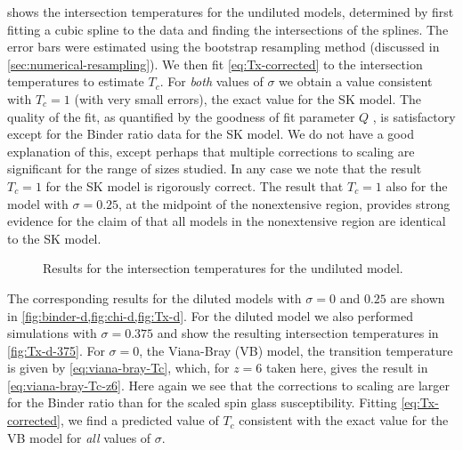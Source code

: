  shows the intersection temperatures for the undiluted models,
determined by first fitting a cubic spline to the data and finding the
intersections of the splines. The error bars were estimated using the bootstrap
resampling method (discussed in \cref{sec:numerical-resampling}). We then fit
\cref{eq:Tx-corrected} to the intersection temperatures to estimate $T_c$. For
\emph{both} values of $\sigma$ we obtain a value consistent with $T_c=1$ (with
very small errors), the exact value for the SK model. The quality of the fit,
as quantified by the goodness of fit parameter $Q$
\autocite{press2007numerical}, is satisfactory except for the Binder ratio data
for the SK model. We do not have a good explanation of this, except perhaps
that multiple corrections to scaling are significant for the range of sizes
studied. In any case we note that the result $T_c=1$ for the SK model is
rigorously correct. The result that $T_c=1$ also for the model with
$\sigma=0.25$, at the midpoint of the nonextensive region, provides strong
evidence for the claim of \textcite{mori2011instability} that all models in the
nonextensive region are identical to the SK model.

\begin{figure}
  \centering
  \begin{subfigure}{0.49\textwidth}
    \centering
    
  \end{subfigure}
  \begin{subfigure}{0.49\textwidth}
    \centering
    
  \end{subfigure}
  \caption[
    Results for the intersection temperatures for the one-dimensional undilted
    model with $\sigma=0$ (SK model) and $\sigma=0.25$.
  ]
  {
    Results for the intersection temperatures for the undiluted model.
  }
  \label{fig:Tx-c}
\end{figure}

The corresponding results for the diluted models with $\sigma=0$ and $0.25$ are
shown in \cref{fig:binder-d,fig:chi-d,fig:Tx-d}. For the diluted model we also
performed simulations with $\sigma=0.375$ and show the resulting intersection
temperatures in \cref{fig:Tx-d-375}. For $\sigma=0$, the Viana-Bray (VB) model,
the transition temperature is given by \cref{eq:viana-bray-Tc}, which, for
$z=6$ taken here, gives the result in \cref{eq:viana-bray-Tc-z6}. Here again we
see that the corrections to scaling are larger for the Binder ratio than for
the scaled spin glass susceptibility. Fitting \cref{eq:Tx-corrected}, we find a
predicted value of $T_c$ consistent with the exact value for the VB model for
\emph{all} values of $\sigma$.

